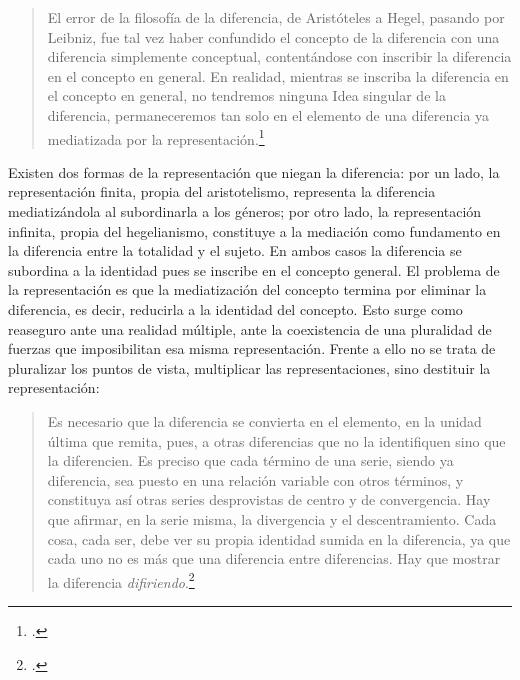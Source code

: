 \documentclass{book}
\begin{document}
\begin{quote}
El error de la filosofía de la diferencia, de Aristóteles a Hegel,
pasando por Leibniz, fue tal vez haber confundido el concepto de la
diferencia con una diferencia simplemente conceptual, contentándose con
inscribir la diferencia en el concepto en general. En realidad, mientras
se inscriba la diferencia en el concepto en general, no tendremos
ninguna Idea singular de la diferencia, permaneceremos tan solo en el
elemento de una diferencia ya mediatizada por la
representación.\footcites[58]{deleuze2005a}[La noción de \enquote{diferencia
  interna} resulta central puesto que se permite comprender la distancia
  con una noción de diferencia externa que no solo parte de la
  imposición del concepto exterior, sino de la oposición. En un texto
  donde rastrea la diferencia en Bergson, Deleuze escribe: \enquote{La filosofía
  mantiene una relación positiva y directa con las cosas solamente en la
  medida en que pretende captar la cosa misma de lo que ella es, en su
  diferencia con respecto a todo lo demás, es decir, en su
  \emph{diferencia interna}. (\dots) Si existen diferencias de
  naturaleza entre individuos de un mismo género, habremos de reconocer
  que, efectivamente, la diferencia no es simplemente espacio-temporal,
  ni tampoco genérica o específica y, en suma, que no es exterior ni
  superior a la cosa misma}.][46]{deleuze2005a}
\end{quote}

Existen dos formas de la representación que niegan la diferencia: por un
lado, la representación finita, propia del aristotelismo, representa la
diferencia mediatizándola al subordinarla a los géneros; por otro lado,
la representación infinita, propia del hegelianismo, constituye a la
mediación como fundamento en la diferencia entre la totalidad y el
sujeto. En ambos casos la diferencia se subordina a la identidad pues se
inscribe en el concepto general. El problema de la representación es que
la mediatización del concepto termina por eliminar la diferencia, es
decir, reducirla a la identidad del concepto. Esto surge como reaseguro
ante una realidad múltiple, ante la coexistencia de una pluralidad de
fuerzas que imposibilitan esa misma representación. Frente a ello no se
trata de pluralizar los puntos de vista, multiplicar las
representaciones, sino destituir la representación:

\begin{quote}
Es necesario que la diferencia se convierta en el elemento, en la unidad
última que remita, pues, a otras diferencias que no la identifiquen sino
que la diferencien. Es preciso que cada término de una serie, siendo ya
diferencia, sea puesto en una relación variable con otros términos, y
constituya así otras series desprovistas de centro y de convergencia.
Hay que afirmar, en la serie misma, la divergencia y el descentramiento.
Cada cosa, cada ser, debe ver su propia identidad sumida en la
diferencia, ya que cada uno no es más que una diferencia entre
diferencias. Hay que mostrar la diferencia \emph{difiriendo}.\footcite[101]{deleuze2005b}
\end{quote}
\end{document}
